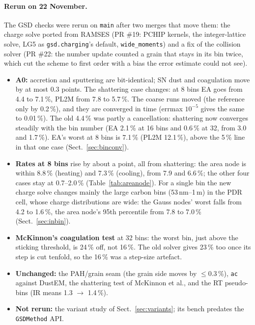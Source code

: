 \documentclass[11pt,a4paper]{article}
\begin{document}
\paragraph{Rerun on 22 November.} The GSD checks were rerun on \texttt{main} after two merges that move them: the
charge solve ported from RAMSES (PR \#19: PCHIP kernels, the integer-lattice solve, LG5 as \texttt{gsd.charging}'s
default, \texttt{wide\_moments}) and a fix of the collision solver (PR \#22: the number update counted a grain that stays
in its bin twice, which cut the scheme to first order with a bias the error estimate could not see).
\begin{itemize}
\item \textbf{A0:} accretion and sputtering are bit-identical; SN dust and coagulation move by at most 0.3 points. The
  shattering case changes: at 8 bins EA goes from 4.4 to 7.1\,\%, PL2M from 7.8 to 5.7\,\%. The coarse runs moved (the
  reference only by 0.2\,\%), and they are converged in time (errmax $10^{-5}$ gives the same to 0.01\,\%). The old
  4.4\,\% was partly a cancellation: shattering now converges steadily with the bin number (EA 2.1\,\% at 16 bins and
  0.6\,\% at 32, from 3.0 and 1.7\,\%). EA's worst at 8 bins is 7.1\,\% (PL2M 12.1\,\%), above the 5\,\% line in that
  one case (Sect.~\ref{sec:binconv}).
\item \textbf{Rates at 8 bins} rise by about a point, all from shattering: the area node is within 8.8\,\% (heating)
  and 7.3\,\% (cooling), from 7.9 and 6.6\,\%; the other four cases stay at 0.7--2.0\,\% (Table~\ref{tab:areanode}).
  For a single bin the new charge solve changes mainly the large carbon bins (53\,nm--1\,\textmu m) in the PDR cell,
  whose charge distributions are wide: the Gauss nodes' worst falls from 4.2 to 1.6\,\%, the area node's 95th
  percentile from 7.8 to 7.0\,\% (Sect.~\ref{sec:inbin}).
\item \textbf{McKinnon's coagulation test} at 32 bins: the worst bin, just above the sticking threshold, is 24\,\% off,
  not 16\,\%. The old solver gives 23\,\% too once its step is cut tenfold, so the 16\,\% was a step-size artefact.
\item \textbf{Unchanged:} the PAH/grain seam (the grain side moves by $\le0.3$\,\%), \texttt{ac} against DustEM, the
  shattering test of McKinnon et al., and the RT pseudo-bins (IR means 1.3 $\to$ 1.4\,\%).
\item \textbf{Not rerun:} the variant study of Sect.~\ref{sec:variants}; its bench predates the \texttt{GSDMethod} API.
\end{itemize}
\end{document}
